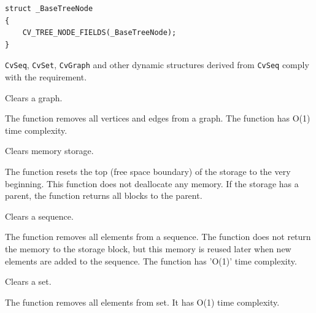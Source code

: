 \begin{lstlisting}
struct _BaseTreeNode
{
    CV_TREE_NODE_FIELDS(_BaseTreeNode);
}
\end{lstlisting}

\texttt{CvSeq}, \texttt{CvSet}, \texttt{CvGraph} and other dynamic structures derived from \texttt{CvSeq} comply with the requirement.

Clears a graph.


\begin{description}
\end{description}

The function removes all vertices and edges from a graph. The function has O(1) time complexity.

Clears memory storage.


\begin{description}
\end{description}

The function resets the top (free space
boundary) of the storage to the very beginning. This function does not
deallocate any memory. If the storage has a parent, the function returns
all blocks to the parent.

Clears a sequence.


\begin{description}
\end{description}

The function removes all elements from a
sequence. The function does not return the memory to the storage block, but this
memory is reused later when new elements are added to the sequence. The function has
'O(1)' time complexity.


Clears a set.


\begin{description}
\end{description}


The function removes all elements from set. It has O(1) time complexity.


